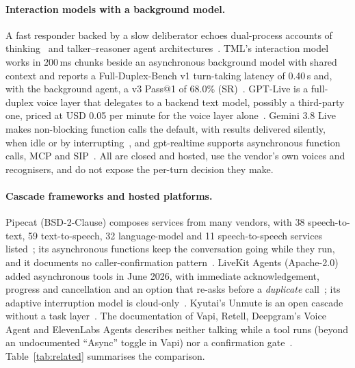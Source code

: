 \paragraph{Interaction models with a background model.}
A fast responder backed by a slow deliberator echoes dual-process accounts of thinking~\citep{kahneman2011thinking}
and talker--reasoner agent architectures~\citep{christakopoulou2024talker}. TML's interaction model works in
200\,ms chunks beside an asynchronous background model with shared context and reports a Full-Duplex-Bench v1
turn-taking latency of 0.40\,s and, with the background agent, a v3 Pass@1 of 68.0\% (SR)~\citep{tml2026interaction}.
GPT-Live is a full-duplex voice layer that delegates to a backend text model, possibly a third-party one, priced at
USD 0.05 per minute for the voice layer alone~\citep{openai2026gptliveapi}. Gemini 3.8 Live makes non-blocking
function calls the default, with results delivered silently, when idle or by interrupting~\citep{google_livecap},
and gpt-realtime supports asynchronous function calls, MCP and SIP~\citep{openai2025gptrealtime}. All are closed and
hosted, use the vendor's own voices and recognisers, and do not expose the per-turn decision they make.

\paragraph{Cascade frameworks and hosted platforms.}
Pipecat (BSD-2-Clause) composes services from many vendors, with 38 speech-to-text, 59 text-to-speech, 32 language-model
and 11 speech-to-speech services listed~\citep{pipecat_services}; its asynchronous functions keep the conversation
going while they run, and it documents no caller-confirmation pattern~\citep{pipecat_fc}. LiveKit Agents (Apache-2.0)
added asynchronous tools in June 2026, with immediate acknowledgement, progress and cancellation and an option that
re-asks before a \emph{duplicate} call~\citep{livekit2026async}; its adaptive interruption model is
cloud-only~\citep{livekit2026adaptive}. Kyutai's Unmute is an open cascade without a task layer~\citep{kyutai_unmute}.
The documentation of Vapi, Retell, Deepgram's Voice Agent and ElevenLabs Agents describes neither talking while a tool
runs (beyond an undocumented ``Async'' toggle in Vapi) nor a confirmation gate~\citep{vapi_tools,retell_interrupt,deepgram_fc,elevenlabs_toolint}.
Table~\ref{tab:related} summarises the comparison.

